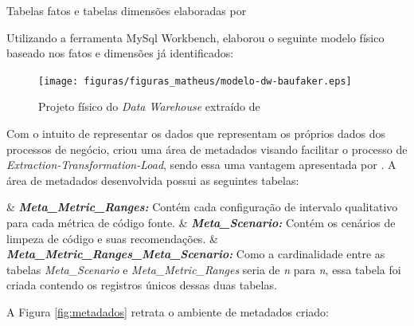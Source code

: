 \begin{table}[!ht]
	\begin{center}
	
	 
	\caption{Tabelas fatos e tabelas dimensões elaboradas por }
	\label{tab:tabelas-fatos-dimensoes}
	\end{center}
	\end{table}	
	\FloatBarrier


Utilizando a ferramenta MySql Workbench,  elaborou o seguinte modelo físico baseado nos fatos e dimensões já identificados:

\begin{figure}[h!]
\centering
\texttt{[image: figuras/figuras\_matheus/modelo-dw-baufaker.eps]}
\caption{Projeto físico do \textit{Data Warehouse} extraído de }
\label{fig:arquitetura_solucao}
\end{figure}
\FloatBarrier

Com o intuito de representar os dados que representam os próprios dados dos processos de negócio,  criou uma área de metadados visando facilitar o processo de \textit{Extraction-Transformation-Load}, sendo essa uma vantagem apresentada por \cite{Kimball2002}. A área de metadados desenvolvida possui as seguintes tabelas:

\begin{easylist}[itemize]

	& \textbf{\textit{Meta\_Metric\_Ranges:}} Contém cada configuração de intervalo qualitativo para cada métrica de código fonte.
	& \textbf{\textit{Meta\_Scenario:}} Contém os cenários de limpeza de código e suas recomendações.
	& \textbf{\textit{Meta\_Metric\_Ranges\_Meta\_Scenario:}} Como a cardinalidade entre as tabelas \textit{Meta\_Scenario} e \textit{Meta\_Metric\_Ranges} seria de \textit{n} para \textit{n}, essa tabela foi criada contendo os registros únicos dessas duas tabelas.
	
	\end{easylist}

A Figura \ref{fig:metadados} retrata o ambiente de metadados criado:

